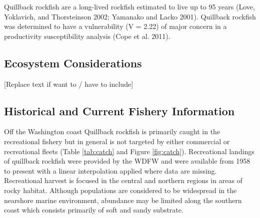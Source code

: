 \documentclass[11pt,
  english,
  a4paper,
]{article}
\begin{document}

Quillback rockfish are a long-lived rockfish estimated to live up to 95 years {(Love, Yoklavich, and Thorsteinson 2002; Yamanako and Lacko 2001)\leavevmode\tagmcend\tagstructend}. Quillback rockfish was determined to have a vulnerability (V = 2.22) of major concern in a productivity susceptibility analysis {(Cope et al. 2011)\leavevmode\tagmcend\tagstructend}.

\leavevmode\tagmcend\tagstructend\par


\hypertarget{ecosystem-considerations}{%
\subsection{Ecosystem Considerations}\label{ecosystem-considerations}}

\leavevmode\tagmcend\tagstructend


{[}Replace text if want to / have to include{]}

\leavevmode\tagmcend\tagstructend\par


\hypertarget{historical-and-current-fishery-information}{%
\subsection{Historical and Current Fishery Information}\label{historical-and-current-fishery-information}}

\leavevmode\tagmcend\tagstructend


Off the Washington coast Quillback rockfish is primarily caught in the recreational fishery but in general is not targeted by either commercial or recreational fleets (Table \ref{tab:catch} and Figure \ref{fig:catch}). Recreational landings of quillback rockfish were provided by the WDFW and were available from 1958 to present with a linear interpolation applied where data are missing. Recreational harvest is focused in the central and northern regions in areas of rocky habitat. Although populations are considered to be widespread in the nearshore marine environment, abundance may be limited along the southern coast which consists primarily of soft and sandy substrate.
\end{document}

